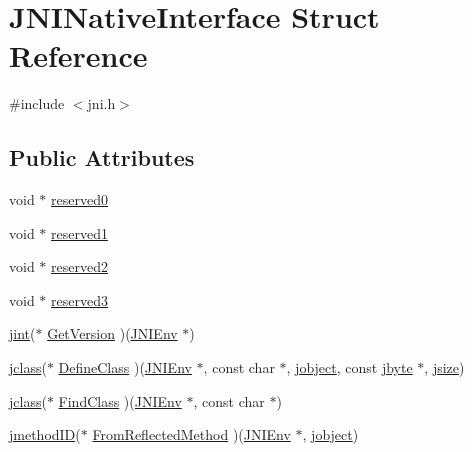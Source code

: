 \hypertarget{struct_j_n_i_native_interface}{\section{J\-N\-I\-Native\-Interface Struct Reference}
\label{struct_j_n_i_native_interface}
}


{\ttfamily \#include $<$jni.\-h$>$}

\subsection*{Public Attributes}
\begin{DoxyCompactItemize}
\item 
void $\ast$ \hyperlink{struct_j_n_i_native_interface_a66886069dfdc1bf70964ffa0c9f152e7}{reserved0}
\item 
void $\ast$ \hyperlink{struct_j_n_i_native_interface_a855556a27b32d2c64350a7c8ffe75ebf}{reserved1}
\item 
void $\ast$ \hyperlink{struct_j_n_i_native_interface_a7af2582938faf043411e76f8aca6d250}{reserved2}
\item 
void $\ast$ \hyperlink{struct_j_n_i_native_interface_ae96ae8dd121221995a5071764606d9a1}{reserved3}
\item 
\hyperlink{jni_8h_ad6e59d976b9b5bae7a19d746bd2879c1}{jint}($\ast$ \hyperlink{struct_j_n_i_native_interface_a2367c1d9e9d25ad9bf6371216191f848}{Get\-Version} )(\hyperlink{jni_8h_a2d06d32b6b6f1519799078a36fe2e380}{J\-N\-I\-Env} $\ast$)
\item 
\hyperlink{jni_8h_a5b236a554a9caf14a835f4e83b4c16b3}{jclass}($\ast$ \hyperlink{struct_j_n_i_native_interface_a854af1c87b4b1e6e63ec4d6ad7c9feba}{Define\-Class} )(\hyperlink{jni_8h_a2d06d32b6b6f1519799078a36fe2e380}{J\-N\-I\-Env} $\ast$, const char $\ast$, \hyperlink{jni_8h_a24647d2a2f02c39f6338c2c6ce4c1004}{jobject}, const \hyperlink{jni_8h_acb5e31bb111c99042a7459568cab51bc}{jbyte} $\ast$, \hyperlink{jni_8h_ae76ffede4acd03ec31101899cce740ea}{jsize})
\item 
\hyperlink{jni_8h_a5b236a554a9caf14a835f4e83b4c16b3}{jclass}($\ast$ \hyperlink{struct_j_n_i_native_interface_a9912828aa8ddc4a6070ea41f1d5f3d08}{Find\-Class} )(\hyperlink{jni_8h_a2d06d32b6b6f1519799078a36fe2e380}{J\-N\-I\-Env} $\ast$, const char $\ast$)
\item 
\hyperlink{jni_8h_a91d8a65fefade9d27c9f749e69f37c40}{jmethod\-I\-D}($\ast$ \hyperlink{struct_j_n_i_native_interface_ae2e46bbc4361bcae036dd61e96fcba30}{From\-Reflected\-Method} )(\hyperlink{jni_8h_a2d06d32b6b6f1519799078a36fe2e380}{J\-N\-I\-Env} $\ast$, \hyperlink{jni_8h_a24647d2a2f02c39f6338c2c6ce4c1004}{jobject})

\end{DoxyCompactItemize}
